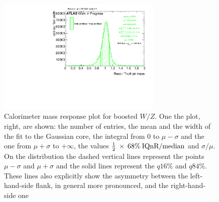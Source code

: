 \begin{figure}[!ht]
  \centering
      \includegraphics[width=0.7\textwidth]{jet_part/8ResponsePTJ_h_JetRatio_mJ05CALO.pdf}
  \caption[$\mcal$ response single $\pt$ bin]{Calorimeter mass response plot for boosted $W/Z$. One the plot, right, are shown: the number of entries, the mean and the width of the fit to the Gaussian core, the integral from 0 to $\mu-\sigma$ and the one from $\mu+\sigma$ to $+\infty$, the values $\frac{1}{2}\: \times\: 68\% \:\textrm{IQnR/median}$ and $\sigma/\mu$. On the distribution the dashed vertical lines represent the points $\mu-\sigma$ and $\mu+\sigma$ and the solid lines represent the $q16\%$ and $q84\%$. These lines also explicitly show the asymmetry between the left-hand-side flank, in general more pronounced, and the right-hand-side one}
  \label{fig:iqrbin}
\end{figure}

